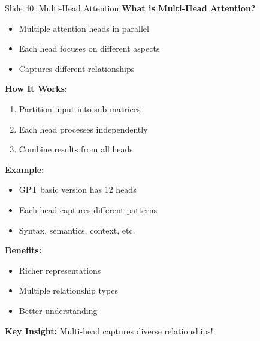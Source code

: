 \documentclass[8pt]{beamer}
\begin{document}
	\begin{frame}{Slide 40: Multi-Head Attention}
		\fontsize{6.5}{7.5}\selectfont
		\textbf{What is Multi-Head Attention?}
		\begin{itemize}
			\item Multiple attention heads in parallel
			\item Each head focuses on different aspects
			\item Captures different relationships
		\end{itemize}
		
		\vspace{0.1cm}
		\textbf{How It Works:}
		\begin{enumerate}
			\item Partition input into sub-matrices
			\item Each head processes independently
			\item Combine results from all heads
		\end{enumerate}
		
		\vspace{0.1cm}
		\textbf{Example:}
		\begin{itemize}
			\item GPT basic version has 12 heads
			\item Each head captures different patterns
			\item Syntax, semantics, context, etc.
		\end{itemize}
		
		\vspace{0.1cm}
		\textbf{Benefits:}
		\begin{itemize}
			\item Richer representations
			\item Multiple relationship types
			\item Better understanding
		\end{itemize}
		
		\textcolor{myblue}{\textbf{Key Insight:}} Multi-head captures diverse relationships!
	\end{frame}
	
\end{document}

